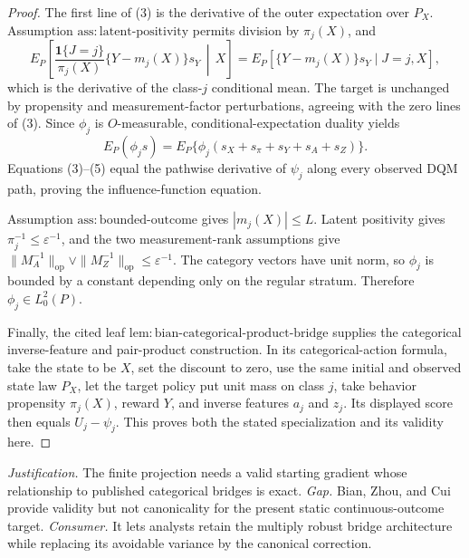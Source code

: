 \documentclass{article}
\begin{document}
\begin{proof}
The first line of (3) is the derivative of the outer expectation over \(P_X\).  Assumption \(\mathrm{ass{:}latent\mbox{-}positivity}\) permits division by \(\pi_j(X)\), and
\[
 E_P\!\left[
 \frac{\mathbf 1\{J=j\}}{\pi_j(X)}
 \{Y-m_j(X)\}s_Y\,\middle|\,X\right]
 =E_P[\{Y-m_j(X)\}s_Y\mid J=j,X], \tag{4}
\]
which is the derivative of the class-\(j\) conditional mean.  The target is unchanged by propensity and measurement-factor perturbations, agreeing with the zero lines of (3).  Since \(\phi_j\) is \(O\)-measurable, conditional-expectation duality yields
\[
 E_P(\phi_js)
 =E_P\{\phi_j(s_X+s_\pi+s_Y+s_A+s_Z)\}. \tag{5}
\]
Equations (3)--(5) equal the pathwise derivative of \(\psi_j\) along every observed DQM path, proving the influence-function equation.

Assumption \(\mathrm{ass{:}bounded\mbox{-}outcome}\) gives \(|m_j(X)|\leq L\).  Latent positivity gives \(\pi_j^{-1}\leq\varepsilon^{-1}\), and the two measurement-rank assumptions give
\(\|M_A^{-1}\|_{\mathrm{op}}\vee\|M_Z^{-1}\|_{\mathrm{op}}\leq\varepsilon^{-1}\).
The category vectors have unit norm, so \(\phi_j\) is bounded by a constant depending only on the regular stratum.  Therefore \(\phi_j\in L^2_0(P)\).

Finally, the cited leaf \(\mathrm{lem{:}bian\mbox{-}categorical\mbox{-}product\mbox{-}bridge}\) supplies the categorical inverse-feature and pair-product construction.  In its categorical-action formula, take the state to be \(X\), set the discount to zero, use the same initial and observed state law \(P_X\), let the target policy put unit mass on class \(j\), take behavior propensity \(\pi_j(X)\), reward \(Y\), and inverse features \(a_j\) and \(z_j\).  Its displayed score then equals \(U_j-\psi_j\).  This proves both the stated specialization and its validity here.
\end{proof}
\par\smallskip\noindent \textit{Justification.} The finite projection needs a valid starting gradient whose relationship to published categorical bridges is exact. \textit{Gap.} Bian, Zhou, and Cui provide validity but not canonicality for the present static continuous-outcome target. \textit{Consumer.} It lets analysts retain the multiply robust bridge architecture while replacing its avoidable variance by the canonical correction.
\end{document}
